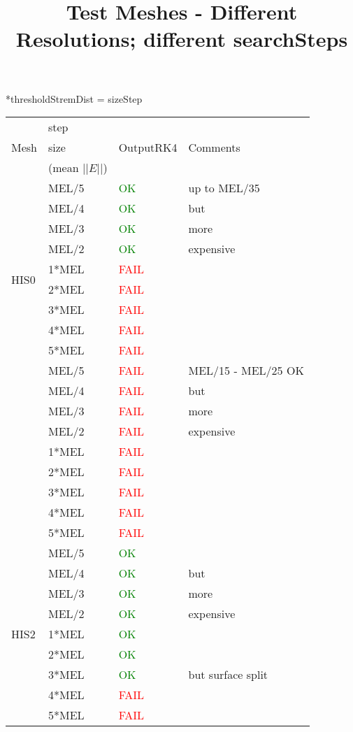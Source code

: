 \documentclass{article}
\author{}
\title{Test Meshes - Different Resolutions; different searchSteps}
\begin{document}
\maketitle


     *thresholdStremDist = sizeStep
\begin{tabular}{ |l|l|l|l| }
\hline
\multirow{3}{*}{Mesh} & step  & \multirow{3}{*}{OutputRK4}  & \multirow{3}{*}{Comments} \\
 & size & & \\
 & (mean $||E||$) & & \\ \hline
\multirow{10}{*}{HIS0} & MEL/5 & \textcolor{green}{OK}& up to MEL/35\\ 
& MEL/4 & \textcolor{green}{OK} & but \\
 & MEL/3 &  \textcolor{green}{OK} & more \\
 & MEL/2 &  \textcolor{green}{OK} & expensive\\
 & 1*MEL &    \textcolor{red}{FAIL} & \\ 
 & 2*MEL & \textcolor{red}{FAIL} & \\
 & 3*MEL &  \textcolor{red}{FAIL} & \\
 & 4*MEL &  \textcolor{red}{FAIL} & \\
 & 5*MEL &    \textcolor{red}{FAIL} & \\ \hline
 
\multirow{10}{*}{HIS1} & MEL/5 & \textcolor{red}{FAIL}& MEL/15 - MEL/25 OK\\ 
& MEL/4 & \textcolor{red}{FAIL} & but \\
 & MEL/3 &  \textcolor{red}{FAIL} & more \\
 & MEL/2 &  \textcolor{red}{FAIL} & expensive\\
 & 1*MEL &    \textcolor{red}{FAIL } & \\ 
 & 2*MEL & \textcolor{red}{FAIL } & \\
 & 3*MEL &  \textcolor{red}{FAIL } & \\
 & 4*MEL &  \textcolor{red}{FAIL } & \\
 & 5*MEL &    \textcolor{red}{FAIL } & \\ \hline
 
 \multirow{10}{*}{HIS2} & MEL/5 & \textcolor{green}{OK}& \\ 
& MEL/4 & \textcolor{green}{OK} & but \\
 & MEL/3 &  \textcolor{green}{OK} & more \\
 & MEL/2 &  \textcolor{green}{OK} & expensive\\
 & 1*MEL &    \textcolor{green}{OK} & \\ 
 & 2*MEL & \textcolor{green}{OK} & \\
 & 3*MEL &  \textcolor{green}{OK} & but surface split\\
 & 4*MEL &  \textcolor{red}{FAIL} & \\
 & 5*MEL &    \textcolor{red}{FAIL} & \\ \hline

\end{tabular}
\end{document}
